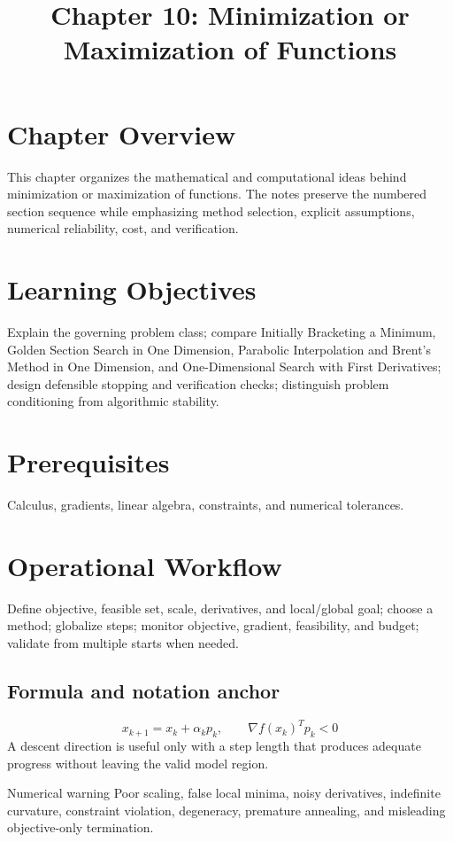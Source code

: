 \documentclass[10pt,letterpaper]{article}
\title{Chapter 10: Minimization or Maximization of Functions}
\author{}
\date{}
\begin{document}
\maketitle

\section*{Chapter Overview}
This chapter organizes the mathematical and computational ideas behind minimization or maximization of functions. The notes preserve the numbered section sequence while emphasizing method selection, explicit assumptions, numerical reliability, cost, and verification.

\section*{Learning Objectives}
Explain the governing problem class; compare Initially Bracketing a Minimum, Golden Section Search in One Dimension, Parabolic Interpolation and Brent's Method in One Dimension, and One-Dimensional Search with First Derivatives; design defensible stopping and verification checks; distinguish problem conditioning from algorithmic stability.

\section*{Prerequisites}
Calculus, gradients, linear algebra, constraints, and numerical tolerances.

\section*{Operational Workflow}
Define objective, feasible set, scale, derivatives, and local/global goal; choose a method; globalize steps; monitor objective, gradient, feasibility, and budget; validate from multiple starts when needed.

\subsection*{Formula and notation anchor}
\[
x_{k+1}=x_k+\alpha_k p_k,\qquad \nabla f(x_k)^T p_k<0
\]
A descent direction is useful only with a step length that produces adequate progress without leaving the valid model region.

\begin{warnbox}{Numerical warning}
Poor scaling, false local minima, noisy derivatives, indefinite curvature, constraint violation, degeneracy, premature annealing, and misleading objective-only termination.
\end{warnbox}
\end{document}
